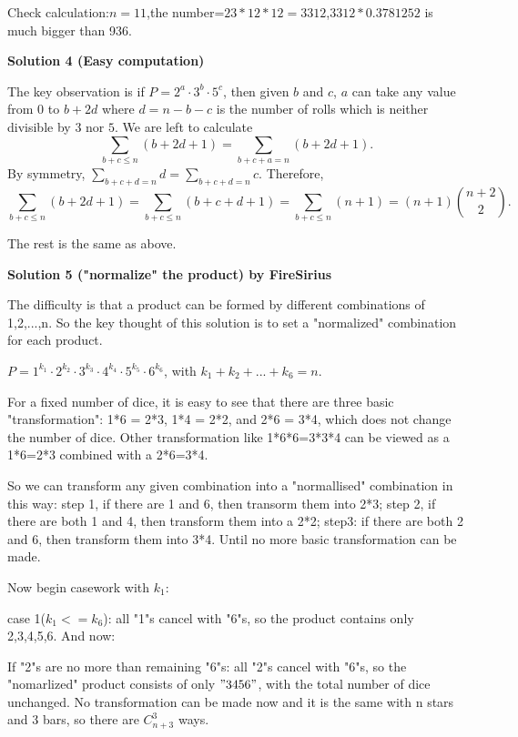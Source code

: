 \begin{enumerate}
 Check calculation:$n=11$,the number=$23*12*12=3312$,$3312*0.378$\approx$1252$ is much bigger than 936.

 



\textbf{Solution 4 (Easy computation)}

The key observation is if $P=2^a\cdot 3^b \cdot 5^c$, then given $b$ and $c$, $a$ can take any value from $0$ to $b+2d$ where $d=n-b-c$ is the number of rolls which is neither divisible by $3$ nor $5$. We are left to calculate
 \[\sum_{b+c\leq n} (b+2d+1)=\sum_{b+c+a=n} (b+2d+1).\]By symmetry, $\sum_{b+c+d=n} d = \sum_{b+c+d=n} c$. Therefore,
 \[\sum_{b+c\leq n}(b+2d+1)=\sum_{b+c\leq n}(b+c+d+1)=\sum_{b+c\leq n}(n+1)=(n+1)\binom{n+2}{2}.\]

 The rest is the same as above.

 



\textbf{Solution 5 ("normalize" the product) by FireSirius}

The difficulty is that a product can be formed by different combinations of 1,2,...,n. So the key thought of this solution is to set a "normalized" combination for each product.

 $P=1^{k_1}\cdot 2^{k_2} \cdot 3^{k_3}\cdot 4^{k_4}\cdot 5^{k_5} \cdot 6^{k_6}$, with $k_1+k_2+...+k_6=n$.

 For a fixed number of dice, it is easy to see that there are three basic "transformation": 1*6 = 2*3, 1*4 = 2*2, and 2*6 = 3*4, which does not change the number of dice. Other transformation like 1*6*6=3*3*4 can be viewed as a 1*6=2*3 combined with a 2*6=3*4. 

 So we can transform any given combination into a "normallised" combination in this way: step 1, if there are 1 and 6, then transorm them into 2*3; step 2, if there are both 1 and 4, then transform them into a 2*2; step3: if there are both 2 and 6, then transform them into 3*4. Until no more basic transformation can be made.

 Now begin casework with $k_1$:

 case 1($k_1 <= k_6$): all "1"s cancel with "6"s, so the product contains only 2,3,4,5,6. And now:

 If "2"s are no more than remaining "6"s: all "2"s cancel with "6"s, so the "nomarlized" product consists of only $"3456"$, with the total number of dice unchanged. No transformation can be made now and it is the same with n stars and 3 bars, so there are $C^3_{n+3}$ ways. 


\end{enumerate}
